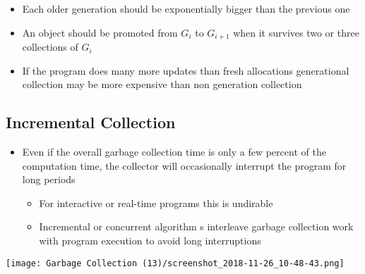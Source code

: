 \documentclass[11pt]{article}
\begin{document}
\begin{itemize}
\begin{itemize}
\begin{itemize}
\begin{itemize}
\end{itemize}
\item Each older generation should be exponentially bigger than the previous one
\item An object should be promoted from \(G_i\) to \(G_{i+1}\) when it survives two or three collections of \(G_i\)
\item If the program does many more updates than fresh allocations generational collection may be more expensive than non generation collection
\end{itemize}
\end{itemize}
\end{itemize}

\subsection{Incremental Collection}
\label{sec:org4b772cc}
\begin{itemize}
\item Even if the overall garbage collection time is only a few percent of the computation time, the collector will occasionally interrupt the program for long periods
\begin{itemize}
\item For interactive or real-time programs this is undirable
\item Incremental or concurrent algorithm s interleave garbage collection work with program execution to avoid long interruptions
\end{itemize}
\end{itemize}

\begin{center}
\texttt{[image: Garbage Collection (13)/screenshot\_2018-11-26\_10-48-43.png]}
\end{center}
\end{document}
